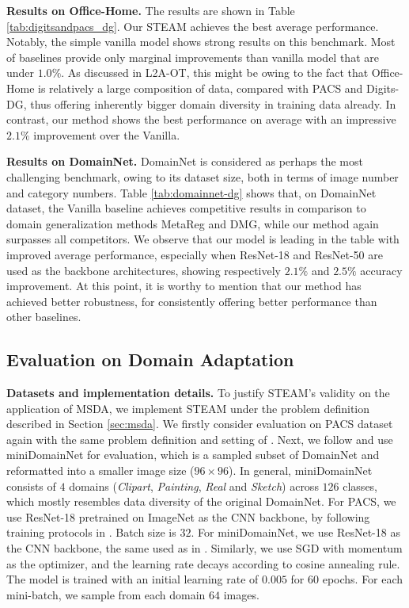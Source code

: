\documentclass[10pt,twocolumn,letterpaper]{article}
\newcommand{\0}{{\bf 0}}
\begin{document}
\textbf{Results on Office-Home.}
The results are shown in Table \ref{tab:digitsandpacs_dg}. Our STEAM achieves the best average performance. Notably, the simple vanilla model shows strong results on this benchmark. Most of baselines provide only marginal improvements than vanilla model that are under $1.0\%$. As discussed in L2A-OT, this might be owing to the fact that Office-Home is relatively a large composition of data, compared with PACS and Digits-DG, thus offering inherently bigger domain diversity in training data already. In contrast, our method shows the best performance on average with an impressive $2.1\%$ improvement over the Vanilla.

\textbf{Results on DomainNet.}
DomainNet is considered as perhaps the most challenging benchmark, owing to its dataset size, both in terms of image number and category numbers. Table \ref{tab:domainnet-dg} shows that, on DomainNet dataset, the Vanilla baseline achieves competitive results in comparison to domain generalization methods MetaReg and DMG, while our method again surpasses all competitors. We observe that our model is leading in the table with improved average performance, especially when ResNet-18 and ResNet-50 are used as the backbone architectures, showing respectively $2.1\%$ and $2.5\%$ accuracy improvement. At this point, it is worthy to mention that our method has achieved better robustness, for consistently offering better performance than other baselines.

\subsection{Evaluation on Domain Adaptation}
\textbf{Datasets and implementation details.} To justify STEAM's validity on the application of MSDA, we implement STEAM under the problem definition described in Section \ref{sec:msda}. We firstly consider evaluation on PACS dataset again with the same problem definition and setting of \cite{yang2020curriculum}. Next, we follow \cite{zhou2020domain} and use miniDomainNet for evaluation, which is a sampled subset of DomainNet and reformatted into a smaller image size ($96\times96$). In general, miniDomainNet consists of $4$ domains (\textit{Clipart}, \textit{Painting}, \textit{Real} and \textit{Sketch}) across $126$ classes, which mostly resembles data diversity of the original DomainNet. For PACS, we use ResNet-18 pretrained on ImageNet as the CNN backbone, by following training protocols in \cite{yang2020curriculum}. Batch size is $32$. For miniDomainNet, we use ResNet-18 as the CNN backbone, the same used as in \cite{zhou2020domain}. Similarly, we use SGD with momentum as the optimizer, and the learning rate decays according to cosine annealing rule. The model is trained with an initial learning rate of $0.005$ for $60$ epochs. For each mini-batch, we sample from each domain $64$ images.
\end{document}
